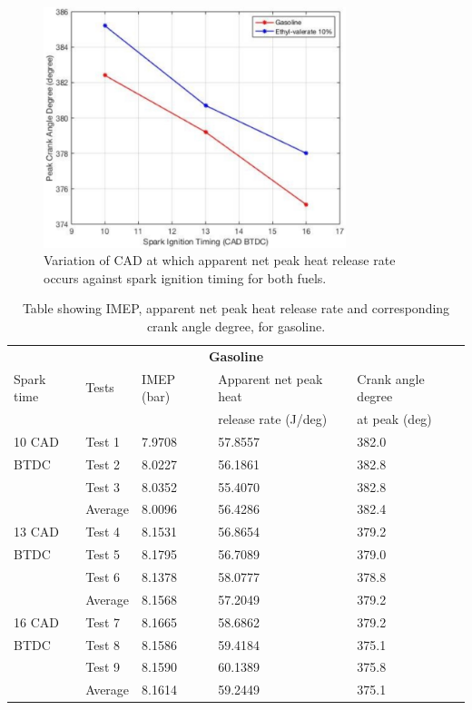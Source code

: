 \documentclass[11pt]{article}
\begin{document}
\begin{figure}[H]
    \centering
    \includegraphics[height = 7cm]{./img/diagram15.png}
    \caption{Variation of CAD at which apparent net peak heat release rate occurs against spark ignition timing for both fuels.}
    \label{q1-f8}
\end{figure}
\begin{table}[H]
    \begin{center}
    \begin{tabular}{@{}l l l l l@{}}
        \toprule
        \multicolumn{5}{c}{\textbf{Gasoline}}\\
        Spark time & Tests & IMEP (bar) & Apparent net peak heat & Crank angle degree\\
        & & & release rate (\si{\joule}/deg) & at peak (deg)\\
        \midrule
        10 CAD  & Test 1    & 7.9708    & 57.8557   & 382.0\\
        BTDC    & Test 2    & 8.0227    & 56.1861   & 382.8\\
                & Test 3    & 8.0352    & 55.4070   & 382.8\\
                & Average   & 8.0096    & 56.4286   & 382.4\\
        13 CAD  & Test 4    & 8.1531    & 56.8654   & 379.2\\
        BTDC    & Test 5    & 8.1795    & 56.7089   & 379.0\\
                & Test 6    & 8.1378    & 58.0777   & 378.8\\
                & Average   & 8.1568    & 57.2049   & 379.2\\
        16 CAD  & Test 7    & 8.1665    & 58.6862   & 379.2\\
        BTDC    & Test 8    & 8.1586    & 59.4184   & 375.1\\
                & Test 9    & 8.1590    & 60.1389   & 375.8\\
                & Average   & 8.1614    & 59.2449   & 375.1\\
        \bottomrule
    \end{tabular}
    \caption{Table showing IMEP, apparent net peak heat release rate and corresponding crank angle degree, for gasoline.}
    \label{q1-t1}
\end{center}
\end{table}
\end{document}
